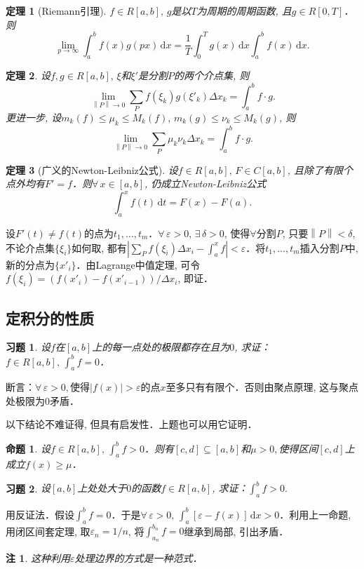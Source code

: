 \documentclass[11pt,a4paper]{ctexart}
\makeatletter
\theoremstyle{thmseries} %
\newtheorem{thm}{定理}[section]
\newtheorem{prop}{命题}[section]
\theoremstyle{exerseries}
\newtheorem{exer}{习题}[section]
\newtheorem*{rem}{注}
\renewenvironment{proof}[1][\proofname]{\par
  \pushQED{\qed}%
  \normalfont \topsep6\p@\@plus6\p@\relax
  \trivlist
  \item[\hskip\labelsep
        \itshape
    #1\@addpunct{}]\ignorespaces
}{%
  \popQED\endtrivlist\@endpefalse
}
\newenvironment{pf}{\begin{proof}[\bfseries\upshape 证\quad]}{\end{proof}}
\renewcommand{\epsilon}{\varepsilon}
\renewcommand{\d}{\mathrm{d}}
\newcommand{\norm}[1]{\left\lVert #1 \right\rVert}
\makeatother
\begin{document}
\begin{thm}[Riemann引理]
	$f\in R[a,b],\,g$是以$T$为周期的周期函数, 且$g\in R[0,T]$．则
	\[\lim_{p\to\infty}\int_{a}^{b}f(x)g(px)\,\d x=\frac{1}{T}\int_{0}^{T}g(x)\,\d x\int_{a}^{b}f(x)\,\d x.\]
\end{thm}

\begin{thm}
	设$f,g\in R[a,b],\,\xi$和$\xi'$是分割$P$的两个介点集, 则
	\[\lim_{\norm{P}\to0}\sum_P f(\xi_k)g(\xi'_k)\Delta x_k=\int_{a}^{b}f\cdot g.\]
	更进一步, 设$m_k(f)\leq\mu_k\leq M_k(f),\,m_k(g)\leq\nu_k\leq M_k(g)$, 则
	\[\lim_{\norm{P}\to0}\sum_P \mu_k\nu_k\Delta x_k=\int_{a}^{b}f\cdot g.\]
\end{thm}

\begin{thm}[广义的Newton-Leibniz公式]
	设$f\in R[a,b],\,F\in C[a,b]$, 且除了有限个点外均有$F'=f$．则$\forall\,x\in[a,b]$, 仍成立Newton-Leibniz公式
	\[\int_{a}^{x}f(t)\,\d t=F(x)-F(a).\]
\end{thm}
\begin{pf}
	设$F'(t)\neq f(t)$的点为$t_1,\dots,t_m$．$\forall\,\epsilon>0,\,\exists\,\delta>0$, 使得$\forall$分割$P$, 只要$\norm{P}<\delta$, 不论介点集$\{\xi_i\}$如何取, 都有$\left|\sum_P f(\xi_i)\Delta x_i-\int_{a}^{x}f\right|<\epsilon$．将$t_1,\dots,t_m$插入分割$P$中, 新的分点为$\{x'_i\}$．由Lagrange中值定理, 可令$f(\xi_i)=(f(x'_i)-f(x'_{i-1}))/\Delta x_i$, 即证．
\end{pf}


\subsection{定积分的性质}
\begin{exer}
	设$f$在$[a,b]$上的每一点处的极限都存在且为$0$, 求证：$f\in R[a,b],\,\int_{a}^{b}f=0$．
\end{exer}
\begin{pf}
	断言：$\forall\,\epsilon>0,$使得$|f(x)|>\epsilon$的点$x$至多只有有限个．否则由聚点原理, 这与聚点处极限为0矛盾．
\end{pf}

以下结论不难证得, 但具有启发性．上题也可以用它证明．
\begin{prop}
	设$f\in R[a,b],\,\int_{a}^{b}f>0$．则有$[c,d]\subseteq[a,b]$和$\mu>0,$使得区间$[c,d]$上成立$f(x)\geq\mu$．
\end{prop}

\begin{exer}
	设$[a,b]$上处处大于$0$的函数$f\in R[a,b]$, 求证：$\int_{a}^{b}f>0.$
\end{exer}
\begin{pf}
	用反证法．假设$\int_{a}^{b}f=0$．于是$\forall\,\epsilon>0,\,\int_{a}^{b}[\epsilon-f(x)]\,\d x>0$．利用上一命题, 用闭区间套定理, 取$\epsilon_n=1/n$, 将$\int_{a_n}^{b_n}f=0$继承到局部, 引出矛盾．
\end{pf}
\begin{rem}
	这种利用$\epsilon$处理边界的方式是一种范式．
\end{rem}
\end{document}
